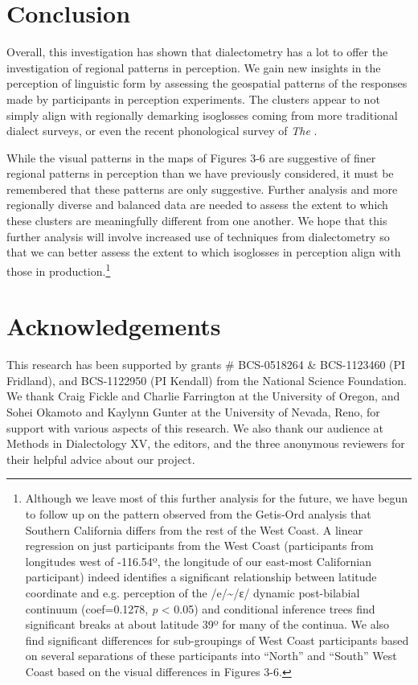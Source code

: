 \documentclass[output=paper]{LSP/langsci}
\begin{document}
\section{Conclusion}
Overall, this investigation has shown that dialectometry has a lot to offer the investigation of regional patterns in perception. We gain new insights in the perception of linguistic form by assessing the geospatial patterns of the responses made by participants in perception experiments. The clusters appear to not simply align with regionally demarking isoglosses coming from more traditional dialect surveys, or even the recent phonological survey of \textit{The } \citep{labov_atlas_2006-1}.

\largerpage[-1]
While the visual patterns in the maps of Figures 3-6 are suggestive of finer regional patterns in perception than we have previously considered, it must be remembered that these patterns are only suggestive. Further analysis and more regionally diverse and balanced data are needed to assess the extent to which these clusters are meaningfully different from one another. We hope that this further analysis will involve increased use of techniques from dialectometry so that we can better assess the extent to which isoglosses in perception align with those in production.\footnote{Although we leave most of this further analysis for the future, we have begun to follow up on the pattern observed from the Getis-Ord analysis that Southern California differs from the rest of the West Coast. A linear regression on just participants from the West Coast (participants from longitudes west of -116.54º, the longitude of our east-most Californian participant) indeed identifies a significant relationship between latitude coordinate and e.g. perception of the /e/{\textasciitilde}/ɛ/ dynamic post-bilabial continuum (coef=0.1278, \textit{p} {\textless} 0.05) and conditional inference trees find significant breaks at about latitude 39º for many of the continua. We also find significant differences for sub-groupings of West Coast participants based on several separations of these participants into “North” and “South” West Coast based on the visual differences in Figures 3-6.}

\section*{Acknowledgements}
This research has been supported by grants \# BCS-0518264 \& BCS-1123460 (PI Fridland), and BCS-1122950 (PI Kendall) from the National Science Foundation. We thank Craig Fickle and Charlie Farrington at the University of Oregon, and Sohei Okamoto and Kaylynn Gunter at the University of Nevada, Reno, for support with various aspects of this research. We also thank our audience at Methods in Dialectology XV, the editors, and the three anonymous reviewers for their helpful advice about our project.

\printbibliography[heading=subbibliography,notkeyword=this]
\end{document}
